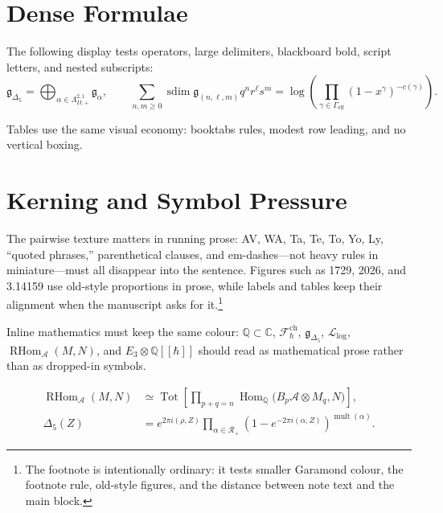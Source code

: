 \documentclass[11pt]{memoir}
\begin{document}
\section{Dense Formulae}

The following display tests operators, large delimiters, blackboard bold,
script letters, and nested subscripts:
\[
  \mathfrak g_{\Delta_5}
  =
  \bigoplus_{\alpha \in \Lambda^{2,1}_{II,+}}
  \mathfrak g_{\alpha},
  \qquad
  \sum_{n,m \geq 0}
  \operatorname{sdim}
  \mathfrak g_{(n,\ell,m)}
  q^n r^\ell s^m
  =
  \log\!\left(
    \prod_{\gamma \in \Gamma_{\mathrm{eff}}}
    (1-x^\gamma)^{-c(\gamma)}
  \right).
\]

\begin{remark}
Tables use the same visual economy: booktabs rules, modest row leading, and
no vertical boxing.
\end{remark}

\section{Kerning and Symbol Pressure}

The pairwise texture matters in running prose: AV, WA, Ta, Te, To, Yo, Ly,
``quoted phrases,'' parenthetical clauses, and em-dashes---not heavy rules in
miniature---must all disappear into the sentence.  Figures such as 1729,
2026, and 3.14159 use old-style proportions in prose, while labels and
tables keep their alignment when the manuscript asks for it.\footnote{The
footnote is intentionally ordinary: it tests smaller Garamond colour, the
footnote rule, old-style figures, and the distance between note text and the
main block.}

Inline mathematics must keep the same colour: $\mathbb Q \subset \mathbb C$,
$\mathcal F_{\hbar}^{\mathrm{ch}}$, $\mathfrak g_{\Delta_5}$,
$\mathscr L_{\log}$, $\operatorname{RHom}_{\mathcal A}(M,N)$, and
$E_3 \otimes \mathbb Q[[\hbar]]$ should read as mathematical prose rather
than as dropped-in symbols.

\begin{align}
  \operatorname{RHom}_{\mathcal A}(M,N)
  &\simeq
  \operatorname{Tot}
  \left[
    \prod_{p+q=n}
    \operatorname{Hom}_{\mathbb Q}
    \bigl(B_p\mathcal A \otimes M_q,N\bigr)
  \right],\\
  \Delta_5(Z)
  &=
  e^{2\pi i(\rho,Z)}
  \prod_{\alpha\in\mathcal R_+}
  \left(1-e^{-2\pi i(\alpha,Z)}\right)^{\operatorname{mult}(\alpha)}.
\end{align}
\end{document}
